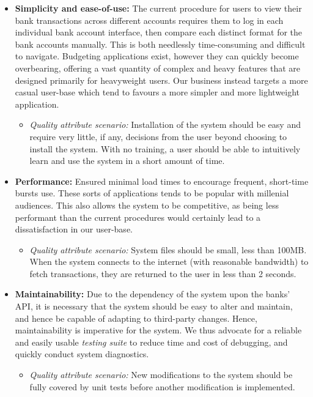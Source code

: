 \begin{itemize}
    \item \textbf{Simplicity and ease-of-use:} The current procedure for users to view their bank transactions across different accounts requires them to log in each individual bank account interface, then compare each distinct format for the bank accounts manually. This is both needlessly time-consuming and difficult to navigate. Budgeting applications exist, however they can quickly become overbearing, offering a vast quantity of complex and heavy features that are designed primarily for heavyweight users. Our business instead targets a more casual user-base which tend to favours a more simpler and more lightweight application.
        \begin{itemize}
            \item \textit{Quality attribute scenario:} Installation of the system should be easy and require very little, if any, decisions from the user beyond choosing to install the system. With no training, a user should be able to intuitively learn and use the system in a short amount of time.
        \end{itemize}
    \item \textbf{Performance:} Ensured minimal load times to encourage frequent, short-time bursts use. These sorts of applications tends to be popular with millenial audiences. This also allows the system to be competitive, as being less performant than the current procedures would certainly lead to a dissatisfaction in our user-base.
        \begin{itemize}
            \item \textit{Quality attribute scenario:} System files should be small, less than 100MB. When the system connects to the internet (with reasonable bandwidth) to fetch transactions, they are returned to the user in less than 2 seconds.
        \end{itemize}
    \item \textbf{Maintainability:} Due to the dependency of the system upon the banks' API, it is necessary that the system should be easy to alter and maintain, and hence be capable of adapting to third-party changes. Hence, maintainability is imperative for the system. We thus advocate for a reliable and easily usable \textit{testing suite} to reduce time and cost of debugging, and quickly conduct system diagnostics.
        \begin{itemize}
            \item \textit{Quality attribute scenario:} New modifications to the system should be fully covered by unit tests before another modification is implemented.

\end{itemize}
\end{itemize}
